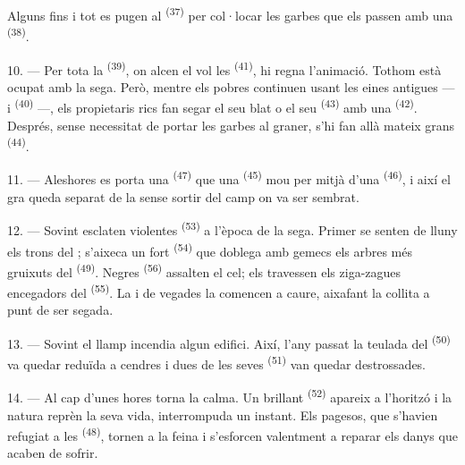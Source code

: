 Alguns fins i tot es pugen al  \textsuperscript{(37)} per col·locar
les garbes que els passen amb una  \textsuperscript{(38)}.

10. --- Per tota la  \textsuperscript{(39)}, on alcen el vol les
 \textsuperscript{(41)}, hi regna l'animació. Tothom està ocupat amb
la sega. Però, mentre els pobres continuen usant les eines antigues ---
 i  \textsuperscript{(40)} ---, els
propietaris rics fan segar el seu blat o el seu 
\textsuperscript{(43)} amb una  \textsuperscript{(42)}.
Després, sense necessitat de portar les garbes al graner, s'hi fan allà mateix
grans  \textsuperscript{(44)}.

11. --- Aleshores es porta una  \textsuperscript{(47)} que una
 \textsuperscript{(45)} mou per mitjà d'una  \textsuperscript{(46)}, i així el gra queda separat de la
 sense sortir del camp on va ser sembrat.

\VUsaut{5.0mm}
\VUsaut{3.4mm}

12. --- Sovint esclaten violentes  \textsuperscript{(53)} a
l'època de la sega. Primer se senten de lluny els trons del ;
s'aixeca un fort  \textsuperscript{(54)} que doblega amb
gemecs els arbres més gruixuts del  \textsuperscript{(49)}. Negres
 \textsuperscript{(56)} assalten el cel; els travessen els
ziga-zagues encegadors del  \textsuperscript{(55)}. La
 i de vegades la  comencen a caure, aixafant la
collita a punt de ser segada.

13. --- Sovint el llamp incendia algun edifici. Així, l'any passat la teulada del
 \textsuperscript{(50)} va quedar reduïda a cendres i dues de
les seves  \textsuperscript{(51)} van quedar destrossades.

14. --- Al cap d'unes hores torna la calma. Un brillant  \textsuperscript{(52)} apareix a l'horitzó i la natura reprèn la seva vida,
interrompuda un instant. Els pagesos, que s'havien refugiat a les
 \textsuperscript{(48)}, tornen a la feina i s'esforcen valentment
a reparar els danys que acaben de sofrir.

